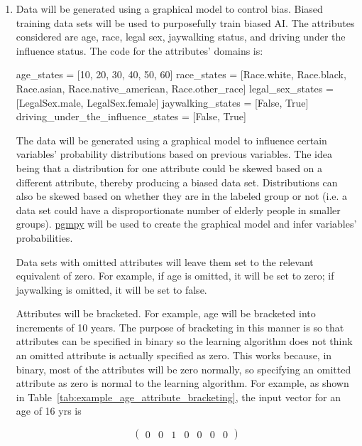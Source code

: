 \documentclass{article}
\begin{document}
\begin{enumerate}
    \item
    Data will be generated using a graphical model to control bias. Biased training data sets will be used to purposefully train biased AI. The attributes considered are age, race, legal sex, jaywalking status, and driving under the influence status. The code for the attributes' domains is:
    
    \begin{python}
age_states = [10, 20, 30, 40, 50, 60]
race_states = [Race.white, Race.black,
               Race.asian,
               Race.native_american,
               Race.other_race]
legal_sex_states = [LegalSex.male,
                    LegalSex.female]
jaywalking_states = [False, True]
driving_under_the_influence_states = [False,
                                      True]
    \end{python}
    
    The data will be generated using a graphical model to influence certain variables' probability distributions based on previous variables. The idea being that a distribution for one attribute could be skewed based on a different attribute, thereby producing a biased data set. Distributions can also be skewed based on whether they are in the labeled group or not (i.e. a data set could have a disproportionate number of elderly people in smaller groups). \href{https://github.com/pgmpy/pgmpy}{pgmpy} will be used to create the graphical model and infer variables' probabilities.

    Data sets with omitted attributes will leave them set to the relevant equivalent of zero. For example, if age is omitted, it will be set to zero; if jaywalking is omitted, it will be set to false.
    
    Attributes will be bracketed. For example, age will be bracketed into increments of 10 years. The purpose of bracketing in this manner is so that attributes can be specified in binary so the learning algorithm does not think an omitted attribute is actually specified as zero. This works because, in binary, most of the attributes will be zero normally, so specifying an omitted attribute as zero is normal to the learning algorithm. For example, as shown in Table~\ref{tab:example_age_attribute_bracketing}, the input vector for an age of 16 yrs is
    
    $$
    \begin{pmatrix}
        0 & 0 & 1 & 0 & 0 & 0 & 0
    \end{pmatrix}
    $$
    

\end{enumerate}
\end{document}

